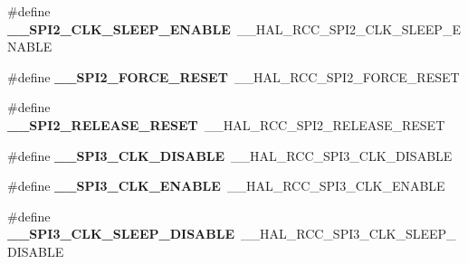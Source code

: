 \begin{DoxyCompactItemize}
\item 
\mbox{\label{group___h_a_l___r_c_c___aliased_gac05baf49d88f18c0f641dca961464abe}} 
\#define {\bfseries \+\_\+\+\_\+\+S\+P\+I2\+\_\+\+C\+L\+K\+\_\+\+S\+L\+E\+E\+P\+\_\+\+E\+N\+A\+B\+LE}~\+\_\+\+\_\+\+H\+A\+L\+\_\+\+R\+C\+C\+\_\+\+S\+P\+I2\+\_\+\+C\+L\+K\+\_\+\+S\+L\+E\+E\+P\+\_\+\+E\+N\+A\+B\+LE
\item 
\mbox{\label{group___h_a_l___r_c_c___aliased_gae187d618acdf2464672bf0b18c34e5cd}} 
\#define {\bfseries \+\_\+\+\_\+\+S\+P\+I2\+\_\+\+F\+O\+R\+C\+E\+\_\+\+R\+E\+S\+ET}~\+\_\+\+\_\+\+H\+A\+L\+\_\+\+R\+C\+C\+\_\+\+S\+P\+I2\+\_\+\+F\+O\+R\+C\+E\+\_\+\+R\+E\+S\+ET
\item 
\mbox{\label{group___h_a_l___r_c_c___aliased_ga92a086f3ba8dd0d3afe55ba477704051}} 
\#define {\bfseries \+\_\+\+\_\+\+S\+P\+I2\+\_\+\+R\+E\+L\+E\+A\+S\+E\+\_\+\+R\+E\+S\+ET}~\+\_\+\+\_\+\+H\+A\+L\+\_\+\+R\+C\+C\+\_\+\+S\+P\+I2\+\_\+\+R\+E\+L\+E\+A\+S\+E\+\_\+\+R\+E\+S\+ET
\item 
\mbox{\label{group___h_a_l___r_c_c___aliased_ga28cdbd67b8d023f6c6d779ad764be780}} 
\#define {\bfseries \+\_\+\+\_\+\+S\+P\+I3\+\_\+\+C\+L\+K\+\_\+\+D\+I\+S\+A\+B\+LE}~\+\_\+\+\_\+\+H\+A\+L\+\_\+\+R\+C\+C\+\_\+\+S\+P\+I3\+\_\+\+C\+L\+K\+\_\+\+D\+I\+S\+A\+B\+LE
\item 
\mbox{\label{group___h_a_l___r_c_c___aliased_gaa92d4898892ab4c0fba44fa0b6ac02b4}} 
\#define {\bfseries \+\_\+\+\_\+\+S\+P\+I3\+\_\+\+C\+L\+K\+\_\+\+E\+N\+A\+B\+LE}~\+\_\+\+\_\+\+H\+A\+L\+\_\+\+R\+C\+C\+\_\+\+S\+P\+I3\+\_\+\+C\+L\+K\+\_\+\+E\+N\+A\+B\+LE
\item 
\mbox{\label{group___h_a_l___r_c_c___aliased_ga7d9b001be65e2b904269e60f476643eb}} 
\#define {\bfseries \+\_\+\+\_\+\+S\+P\+I3\+\_\+\+C\+L\+K\+\_\+\+S\+L\+E\+E\+P\+\_\+\+D\+I\+S\+A\+B\+LE}~\+\_\+\+\_\+\+H\+A\+L\+\_\+\+R\+C\+C\+\_\+\+S\+P\+I3\+\_\+\+C\+L\+K\+\_\+\+S\+L\+E\+E\+P\+\_\+\+D\+I\+S\+A\+B\+LE
\item 
\mbox{\label{group___h_a_l___r_c_c___aliased_gaef9852457424d2e92e6e1cb1366b8981}} 

\end{DoxyCompactItemize}
